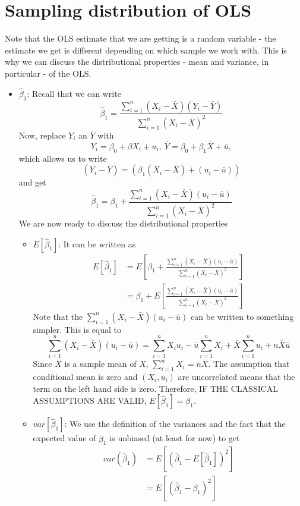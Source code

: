 


\section{Sampling distribution of OLS}
Note that the OLS estimate that we are getting is a random variable - the estimate we get is different depending on which sample we work with. This is why we can discuss the distributional properties - mean and variance, in particular - of the OLS. 
\begin{itemize}
\item $\hat{\beta}_1$: Recall that we can write
\[
\hat{\beta}_1= \frac{\sum_{i=1}^n(X_i-\bar{X})(Y_i-\bar{Y})}{\sum_{i=1}^n(X_i-\bar{X})^2}
\]
Now, replace $Y_i$ an $\bar{Y}$ with 
\[
Y_i =\beta_0 + \beta X_i + u_i, \ \bar{Y} = \beta_0 + \beta_1\bar{X} + \bar{u},
\]
which allows us to write 
\[
(Y_i-\bar{Y}) = (\beta_1(X_i-\bar{X})+(u_i-\bar{u}))
\]
and get
\[
\hat{\beta}_1=\beta_1+  \frac{\sum_{i=1}^n(X_i-\bar{X})(u_i-\bar{u})}{\sum_{i=1}^n(X_i-\bar{X})^2}
\]
We are now ready to discuss the distributional properties
\begin{itemize}
\item $E[\hat{\beta}_1]$: It can be written as
\[
\begin{aligned}
E[\hat{\beta}_1]& = E\left[\beta_1+  \frac{\sum_{i=1}^n(X_i-\bar{X})(u_i-\bar{u})}{\sum_{i=1}^n(X_i-\bar{X})^2}\right]\\
&=\beta_1+ E\left[\frac{\sum_{i=1}^n(X_i-\bar{X})(u_i-\bar{u})}{\sum_{i=1}^n(X_i-\bar{X})^2}\right]
\end{aligned}
\]
Note that the $\sum_{i=1}^n(X_i-\bar{X})(u_i-\bar{u})$ can be written to something simpler. This is equal to
\[
\sum_{i=1}^n(X_i-\bar{X})(u_i-\bar{u})=\sum_{i=1}^nX_iu_i-\bar{u}\sum_{i=1}^n X_i+\bar{X}\sum_{i=1}^nu_i+n\bar{X}\bar{u}
\]
Since $\bar{X}$ is a sample mean of $X$, $\sum_{i=1}^nX_i=n\bar{X}$. The assumption that conditional mean is zero and $(X_i, u_i)$ are uncorrelated means that the term on the left hand side is zero. Therefore, IF THE CLASSICAL ASSUMPTIONS ARE VALID, $E[\hat{\beta}_1]=\beta_1$.
\item $var[\hat{\beta}_1]$: We use the definition of the variances and the fact that the expected value of $\hat{\beta}_1$ is unbiased (at least for now) to get
\[
\begin{aligned}
var(\hat{\beta}_1)&=E\left[\left(\hat{\beta}_1-E[\hat{\beta}_1]\right)^2\right] \\
&=E\left[\left(\hat{\beta}_1-{\beta}_1\right)^2\right]\\

\end{aligned}\]
\end{itemize}
\end{itemize}
